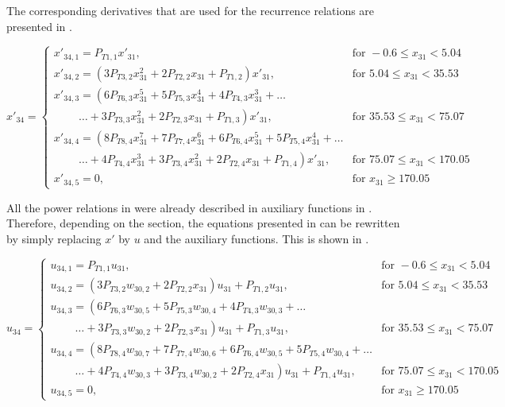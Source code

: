 \noindent
The corresponding derivatives that are used for the recurrence relations are presented in .

\begin{equation}\label{eq:TCondDerAux}
x'_{34}=\begin{cases}
x'_{34,1}=P_{T 1,1}x'_{31}, & \text{for } -0.6 \leq x_{31} < 5.04  \\
x'_{34,2}=\left(3P_{T 3,2}x_{31}^{2}+2P_{T 2,2}x_{31}+P_{T 1,2}\right)x'_{31}, &  \text{for } 5.04\leq x_{31} < 35.53   \\
x'_{34,3}=\left(6 P_{T 6,3}x_{31}^{5}+5P_{T 5,3}x_{31}^{4}+4P_{T 4,3}x_{31}^{3}+ \dots
\right. \\
\qquad\  \left. \dotsc +3P_{T 3,3}x_{31}^{2}+2P_{T 2,3}x_{31}+P_{T 1,3}\right)x'_{31}, &  \text{for } 35.53\leq x_{31} < 75.07   \\
x'_{34,4}=\left(8 P_{T 8,4}x_{31}^{7}+7P_{T 7,4}x_{31}^{6}+6P_{T 6,4}x_{31}^{5}
+5P_{T 5,4}x_{31}^{4}+ \dots \right. \\
\qquad\  \left. \dotsc +4P_{T 4,4}x_{31}^{3}+3P_{T 3,4}x_{31}^{2}+2P_{T 2,4}x_{31}+P_{T 1,4}\right)x'_{31}, &  \text{for } 75.07\leq x_{31} < 170.05   \\
x'_{34,5}=0, &  \text{for }  x_{31} \geq 170.05   
\end{cases}
\end{equation}

\noindent
All the power relations in  were already described in auxiliary functions in . Therefore, depending on the section, the equations presented in  can be rewritten by simply replacing $x'$ by $u$ and the auxiliary functions. This is shown in .

\begin{equation}\label{eq:TCondAuxF}
u_{34}=\begin{cases}
u_{34,1}=P_{T 1,1}u_{31}, & \text{for } -0.6 \leq x_{31} < 5.04  \\
u_{34,2}=\left(3P_{T 3,2}w_{30,2}+2P_{T 2,2}x_{31}\right)u_{31}+P_{T 1,2}u_{31}, &  \text{for } 5.04\leq x_{31} < 35.53   \\
u_{34,3}=\left(6 P_{T 6,3}w_{30,5}+5P_{T 5,3}w_{30,4}+4P_{T 4,3}w_{30,3}+ \dots
\right. \\
\qquad\  \left. \dotsc +3P_{T 3,3}w_{30,2}+2P_{T 2,3}x_{31}\right)u_{31}+P_{T 1,3}u_{31}, &  \text{for } 35.53\leq x_{31} < 75.07   \\
u_{34,4}=\left(8 P_{T 8,4}w_{30,7}+7P_{T 7,4}w_{30,6}+6P_{T 6,4}w_{30,5}
+5P_{T 5,4}w_{30,4}+ \dots \right. \\
\qquad\  \left. \dotsc +4P_{T 4,4}w_{30,3}+3P_{T 3,4}w_{30,2}+2P_{T 2,4}x_{31}\right)u_{31}+P_{T 1,4}u_{31}, &  \text{for } 75.07\leq x_{31} < 170.05   \\
u_{34,5}=0, &  \text{for }  x_{31} \geq 170.05   
\end{cases}
\end{equation}

